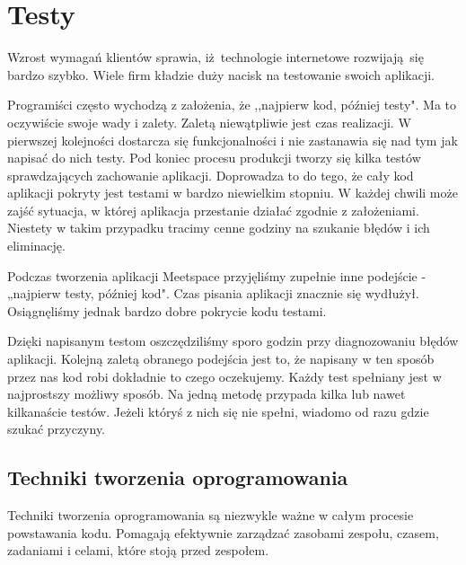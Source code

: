 \section{Testy}
  \label{testy}
  Wzrost wymagań klientów sprawia, iż technologie internetowe rozwijają się bardzo szybko. Wiele firm kładzie duży nacisk na testowanie swoich aplikacji.

  Programiści często wychodzą z założenia, że ,,najpierw kod, później testy". Ma to oczywiście swoje wady i zalety. Zaletą niewątpliwie jest czas realizacji. W pierwszej kolejności dostarcza się funkcjonalności i nie zastanawia się nad tym jak napisać do nich testy. Pod koniec procesu produkcji tworzy się kilka testów sprawdzających zachowanie aplikacji. Doprowadza to do tego, że cały kod aplikacji pokryty jest testami w bardzo niewielkim stopniu. W każdej chwili może zajść sytuacja, w której aplikacja przestanie działać zgodnie z założeniami. Niestety w takim przypadku tracimy cenne godziny na szukanie błędów i ich eliminację.

  Podczas tworzenia aplikacji Meetspace przyjęliśmy zupełnie inne podejście - „najpierw testy, później kod". Czas pisania aplikacji znacznie się wydłużył. Osiągnęliśmy jednak bardzo dobre pokrycie kodu testami.

  Dzięki napisanym testom oszczędziliśmy sporo godzin przy diagnozowaniu błędów aplikacji. Kolejną zaletą obranego podejścia jest to, że napisany w ten sposób przez nas kod robi dokładnie to czego oczekujemy. Każdy test spełniany jest w najprostszy możliwy sposób. Na jedną metodę przypada kilka lub nawet kilkanaście testów. Jeżeli któryś z nich się nie spełni, wiadomo od razu gdzie szukać przyczyny.
  \clearpage
  \subsection{Techniki tworzenia oprogramowania}
    Techniki tworzenia oprogramowania są niezwykle ważne w całym procesie powstawania kodu. Pomagają efektywnie zarządzać zasobami zespołu, czasem, zadaniami i celami, które stoją przed zespołem.

